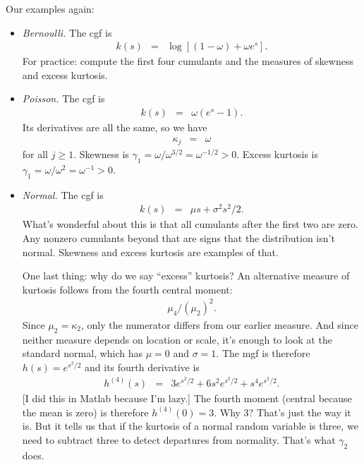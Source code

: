 \documentclass[11pt]{article}
\begin{document}
Our examples again:
%
\begin{itemize}
\item {\it Bernoulli.\/}
The cgf is
\begin{eqnarray*}
    k(s) &=& \log \left[ (1-\omega) + \omega e^{s} \right] .
\end{eqnarray*}
For practice:  compute the first four cumulants and the
measures of skewness and excess kurtosis.

\item {\it Poisson.\/}  The cgf is
\begin{eqnarray*}
    k(s) &=& \omega (e^{s}-1)  .
\end{eqnarray*}
Its derivatives are all the same, so we have
\begin{eqnarray*}
    \kappa_j &=& \omega
\end{eqnarray*}
for all $j\geq 1$.
Skewness is $\gamma_1 = \omega/\omega^{3/2} = \omega^{-1/2} > 0$.
Excess kurtosis is
$\gamma_1 = \omega/\omega^{2} = \omega^{-1} > 0$.


\item {\it Normal.\/}
The cgf is
\begin{eqnarray*}
        k(s) &=& \mu s + \sigma^2 s^2/2  .
\end{eqnarray*}
What's wonderful about this is that all cumulants after the first two are
zero.
Any nonzero cumulants beyond that are signs
that the distribution isn't normal.
Skewness and excess kurtosis are examples of that.

One last thing:  why do we say ``excess'' kurtosis?
An alternative measure of kurtosis
follows from the fourth central moment:
\begin{eqnarray*}
    \mu_4 /(\mu_2)^2 .
\end{eqnarray*}
Since $\mu_2 = \kappa_2$, only the numerator differs
from our earlier measure.
And since neither measure depends on location or scale,
it's enough to look at the standard normal,
which has $\mu = 0$ and $\sigma = 1$.
The mgf is therefore $h(s) = e^{s^2/2}$ and its fourth derivative is
\begin{eqnarray*}
    h^{(4)}(s) &=& 3 e^{s^2/2} + 6 s^2 e^{s^2/2} + s^4 e^{s^2/2} .
\end{eqnarray*}
[I did this in Matlab because I'm lazy.]
The fourth moment (central because the mean is zero) is
therefore $ h^{(4)}(0) = 3$.
Why 3?  That's just the way it is.
But it tells us that if the kurtosis of a normal random variable is three,
we need to subtract three to detect departures from normality.
That's what $\gamma_2$ does.
\end{itemize}
\end{document}
